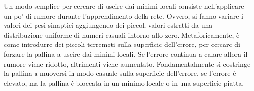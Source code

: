 Un modo semplice per cercare di uscire dai minimi locali consiste nell'applicare
un po' di rumore durante l'apprendimento della rete. Ovvero, si fanno variare
i valori dei pesi sinaptici aggiungendo dei piccoli valori estratti da una
distribuzione uniforme di numeri casuali intorno allo zero. Metaforicamente, è
come introdurre dei piccoli terremoti sulla superficie dell'errore, per cercare
di forzare la pallina a uscire dai minimi locali. Se l'errore continua a calare
allora il rumore viene ridotto, altrimenti viene aumentato. Fondamentalmente si
costringe la pallina a muoversi in modo casuale sulla superficie dell'errore, se
l'errore è elevato, ma la pallina è bloccata in un minimo locale o in una
superficie piatta.


